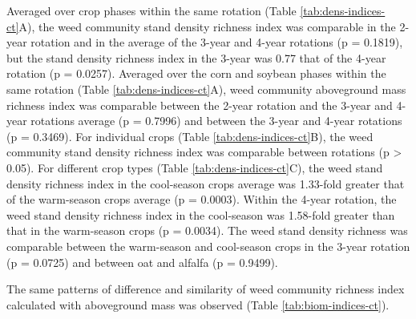 \documentclass[
]{article}
\begin{document}
Averaged over crop phases within the same rotation (Table \ref{tab:dens-indices-ct}A), the weed community stand density richness index was comparable in the 2-year rotation and in the average of the 3-year and 4-year rotations (p = 0.1819), but the stand density richness index in the 3-year was 0.77 that of the 4-year rotation (p = 0.0257). Averaged over the corn and soybean phases within the same rotation (Table \ref{tab:dens-indices-ct}A), weed community aboveground mass richness index was comparable between the 2-year rotation and the 3-year and 4-year rotations average (p = 0.7996) and between the 3-year and 4-year rotations (p = 0.3469). For individual crops (Table \ref{tab:dens-indices-ct}B), the weed community stand density richness index was comparable between rotations (p \textgreater{} 0.05). For different crop types (Table \ref{tab:dens-indices-ct}C), the weed stand density richness index in the cool-season crops average was 1.33-fold greater that of the warm-season crops average (p = 0.0003). Within the 4-year rotation, the weed stand density richness index in the cool-season was 1.58-fold greater than that in the warm-season crops (p = 0.0034). The weed stand density richness was comparable between the warm-season and cool-season crops in the 3-year rotation (p = 0.0725) and between oat and alfalfa (p = 0.9499).

The same patterns of difference and similarity of weed community richness index calculated with aboveground mass was observed (Table \ref{tab:biom-indices-ct}).
\end{document}
